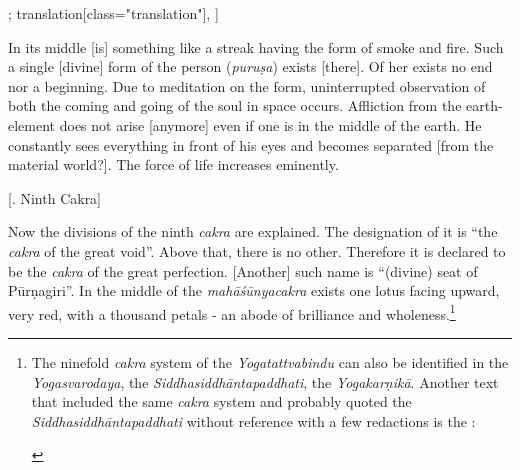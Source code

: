 \begin{alignment}[
  texts=edition[class="edition"];
  translation[class="translation"],
  ]
  \begin{translation}
    \begin{tlate}
      \noindent
In its middle [is] something like a streak having the form of smoke and fire. Such a single [divine] form of the person (\textit{puruṣa}) exists [there].\textsuperscript{} Of her exists no end nor a beginning. Due to meditation on the form, uninterrupted observation of both the coming and going of the soul in space occurs. Affliction from the earth-element does not arise [anymore] even if one is in the middle of the earth. He constantly sees everything in front of his eyes and becomes separated [from the material world?].\textsuperscript{\coro{[\lowroman{15}]}} The force of life increases eminently. 
      \end{tlate}
    \bigskip
    \centerline{\textrm{\small{[.\textsuperscript{} Ninth Cakra]}}}
    \label{cakra9trans}
    \bigskip
    \begin{tlate}
      Now the divisions of the ninth \textit{cakra} are explained. The designation of it is ``the \textit{cakra} of the great void''. Above that, there is no other. Therefore it is declared to be the \textit{cakra} of the great perfection. [Another] such name is ``(divine) seat of Pūrṇagiri''.\textsuperscript{\coro{[\lowroman{5}]}} In the middle of the \textit{mahāśūnyacakra} exists one lotus facing upward, very red, with a thousand petals - an abode of brilliance and wholeness.\footnote{The ninefold \textit{cakra} system of the \textit{Yogatattvabindu} can also be identified in the \textit{Yogasvarodaya}, the \textit{Siddhasiddhāntapaddhati}, the \textit{Yogakarṇikā}. Another text that included the same \textit{cakra} system and probably quoted the \textit{Siddhasiddhāntapaddhati} without reference with a few redactions is the :
        \begin{quote}

\end{quote}}
\end{tlate}
\end{translation}
\end{alignment}
